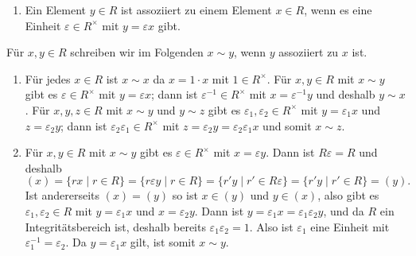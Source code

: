 \begin{solution}
  \begin{enumerate}
    \item
      Ein Element $y \in R$ ist assoziiert zu einem Element $x \in R$, wenn es eine Einheit $\varepsilon \in R^\times$ mit $y = \varepsilon x$ gibt.
  \end{enumerate}
  Für $x, y \in R$ schreiben wir im Folgenden $x \sim y$, wenn $y$ assoziiert zu $x$ ist.
  \begin{enumerate}[resume]
    \item
      Für jedes $x \in R$ ist $x \sim x$ da $x = 1 \cdot x$ mit $1 \in R^\times$.
      Für $x, y \in R$ mit $x \sim y$ gibt es $\varepsilon \in R^\times$ mit $y = \varepsilon x$;
      dann ist $\varepsilon^{-1} \in R^\times$ mit $x = \varepsilon^{-1} y$ und deshalb $y \sim x$.
      Für $x, y, z \in R$ mit $x \sim y$ und $y \sim z$ gibt es $\varepsilon_1, \varepsilon_2 \in R^\times$ mit $y = \varepsilon_1 x$ und $z = \varepsilon_2 y$;
      dann ist $\varepsilon_2 \varepsilon_1 \in R^\times$ mit $z = \varepsilon_2 y = \varepsilon_2 \varepsilon_1 x$ und somit $x \sim z$.
    \item
      Für $x, y \in R$ mit $x \sim y$ gibt es $\varepsilon \in R^\times$ mit $x = \varepsilon y$.
      Dann ist $R \varepsilon = R$ und deshalb
      \[
          (x)
        = \{r x \mid r \in R\}
        = \{r \varepsilon y \mid r \in R\}
        = \{r' y \mid r' \in R \varepsilon\}
        = \{r' y \mid r' \in R\}
        = (y).
      \]
      Ist andererseits $(x) = (y)$ so ist $x \in (y)$ und $y \in (x)$, also gibt es $\varepsilon_1, \varepsilon_2 \in R$ mit $y = \varepsilon_1 x$ und $x = \varepsilon_2 y$.
      Dann ist $y = \varepsilon_1 x = \varepsilon_1 \varepsilon_2 y$, und da $R$ ein Integritätsbereich ist, deshalb bereits $\varepsilon_1 \varepsilon_2 = 1$.
      Also ist $\varepsilon_1$ eine Einheit mit $\varepsilon_1^{-1} = \varepsilon_2$.
      Da $y = \varepsilon_1 x$ gilt, ist somit $x \sim y$.
  \end{enumerate}
\end{solution}


